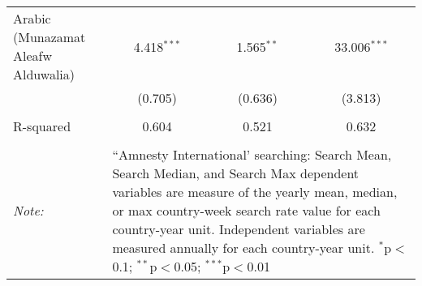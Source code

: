 \begin{table}[!htbp]
\begin{tabular}{@{\extracolsep{5pt}}lccc}
  Arabic (Munazamat Aleafw Alduwalia) & 4.418$^{***}$ & 1.565$^{**}$ & 33.006$^{***}$ \\ 
  & (0.705) & (0.636) & (3.813) \\ 
 \hline \\[-1.8ex] 
R-squared  & 0.604 & 0.521 & 0.632 \\ 
\hline 
\hline \\[-1.8ex] 
\textit{Note:}  & \multicolumn{3}{l}{\parbox[t]{8cm}{``Amnesty International' searching: Search Mean, Search Median, and Search Max dependent variables are measure of the yearly mean, median, or max country-week search rate value for each country-year unit. Independent variables are measured annually for each country-year unit. $^{*}$p$<$0.1; $^{**}$p$<$0.05; $^{***}$p$<$0.01}} \\ 
\end{tabular} 
\end{table} 
